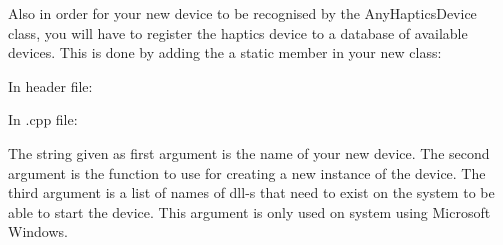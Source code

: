 Also in order for your new device to be recognised by the
AnyHapticsDevice class, you will have to register the haptics device
to a database of available devices. This is done by adding the a
static member in your new class:

In header file:



In .cpp file:



The string given as first argument is the name of your new device. The second
argument is the function to use for creating a new instance of the device. The
third argument is a list of names of dll-s that need to exist on the system to
be able to start the device. This argument is only used on system using
Microsoft Windows.

